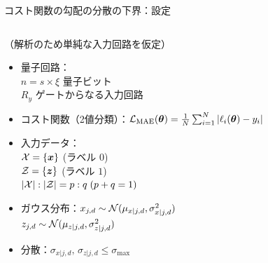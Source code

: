 \documentclass[dvipdfmx,10pt,aspectratio=169]{beamer}
\begin{document}
\newcommand{\bgate}[1]{\gate[wires=1,style={fill=cyan!50}][1cm][0.7cm]{\Large #1}}
\newcommand{\rgate}[1]{\gate[wires=4,style={fill=red!50}]{\Large #1}}
\begin{frame}{コスト関数の勾配の分散の下界：設定}
    \vspace*{-10pt}
    \begin{columns}
        \begin{column}{0.4\textwidth}
            \begin{footnotesize}
                （解析のため単純な入力回路を仮定）
            \end{footnotesize}
            \begin{itemize}
                \setlength{\itemsep}{10pt}
                \item 量子回路：\\$n = s\times\xi$ 量子ビット\\$R_y$ ゲートからなる入力回路
                \item コスト関数（2値分類）：$\mathcal{L}_{\mathrm{MAE}}(\vb*{\theta}) = \frac1N\sum_{i=1}^N |\ell_{i}(\vb*{\theta}) - y_i|$
                \item 入力データ：\\$\mathcal{X} = \{\vb*{x}\}$ (ラベル $0$)\\$\mathcal{Z} = \{\vb*{z}\}$ (ラベル $1$)\\$|\mathcal{X}|:|\mathcal{Z}| = p:q\;(p+q=1)$
                \item ガウス分布：$x_{j,d} \sim \mathcal{N}(\mu_{x|j,d}, \sigma_{x|j,d}^2)$\\$z_{j,d} \sim \mathcal{N}(\mu_{z|j,d}, \sigma_{z|j,d}^2)$
                \item 分散：$\sigma_{x|j,d},\, \sigma_{z|j,d} \leq \sigma_{\max}$
            \end{itemize}
        \end{column}
        \begin{column}{0.6\textwidth}
        \begin{figure}[H]
            \centering
\end{figure}
\end{column}
\end{columns}
\end{frame}
\end{document}
